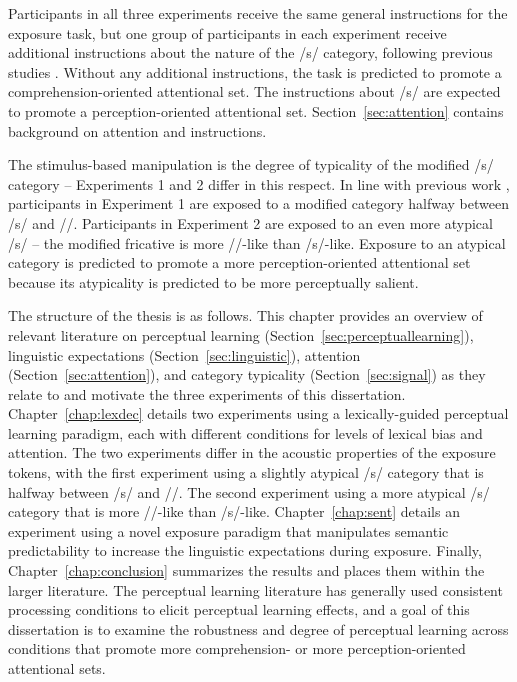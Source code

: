 Participants in all three experiments receive the same general instructions for the exposure task, but one group of participants in each experiment receive additional instructions about the nature of the /s/ category, following previous studies \citep{Pitt2012}.
Without any additional instructions, the task is predicted to promote a comprehension-oriented attentional set.
The instructions about /s/ are expected to promote a perception-oriented attentional set.
Section~\ref{sec:attention} contains background on attention and instructions.

The stimulus-based manipulation is the degree of typicality of the modified /s/ category -- Experiments 1 and 2 differ in this respect. 
In line with previous work \citep{Norris2003}, participants in Experiment 1 are exposed to a modified category halfway between /s/ and /\textesh/. 
Participants in Experiment 2 are exposed to an even more atypical /s/ -- the modified fricative is more /\textesh/-like than /s/-like.  
Exposure to an atypical category is predicted to promote a more perception-oriented attentional set because its atypicality is predicted to be more perceptually salient.

The structure of the thesis is as follows.
This chapter provides an overview of relevant literature on perceptual learning (Section~\ref{sec:perceptuallearning}), linguistic expectations (Section~\ref{sec:linguistic}), attention (Section~\ref{sec:attention}), and category typicality (Section~\ref{sec:signal}) as they relate to and motivate the three experiments of this dissertation.
Chapter~\ref{chap:lexdec} details two experiments using a lexically-guided perceptual learning paradigm, each with different conditions for levels of lexical bias and attention.  
The two experiments differ in the acoustic properties of the exposure tokens, with the first experiment using a slightly atypical /s/ category that is halfway between /s/ and /\textesh/.
The second experiment using a more atypical /s/ category that is more /\textesh/-like than /s/-like.  
Chapter~\ref{chap:sent} details an experiment using a novel exposure paradigm that manipulates semantic predictability to increase the linguistic expectations during exposure.
Finally, Chapter~\ref{chap:conclusion} summarizes the results and places them within the larger literature.
The perceptual learning literature has generally used consistent processing conditions to elicit perceptual learning effects, and a goal of this dissertation is to examine the robustness and degree of perceptual learning across conditions that promote more comprehension- or more perception-oriented attentional sets.

